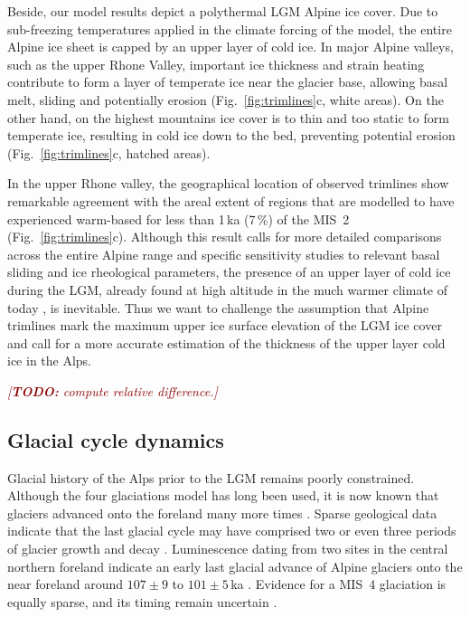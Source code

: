 \documentclass[tc, manuscript]{copernicus}
\newcommand{\todo}[1]{\textcolor{darkred}{\emph{[\textbf{TODO:} #1]}}}
\begin{document}
    Beside, our model results depict a polythermal LGM Alpine ice cover.
    Due to sub-freezing temperatures applied in the climate forcing of the
    model, the entire Alpine ice sheet is capped by an upper layer of cold ice.
    In major Alpine valleys, such as the upper Rhone Valley, important ice
    thickness and strain heating contribute to form a layer of temperate ice
    near the glacier base, allowing basal melt, sliding and potentially
    erosion (Fig.~\ref{fig:trimlines}c, white areas). On the other hand, on the
    highest mountains ice cover is to thin and too static to form temperate
    ice, resulting in cold ice down to the bed, preventing potential erosion
    (Fig.~\ref{fig:trimlines}c, hatched areas).

    In the upper Rhone valley, the geographical location of observed trimlines
    show remarkable agreement with the areal extent of regions that are
    modelled to have experienced warm-based for less than 1\,ka (7\,\%) of the
    MIS~2 (Fig.~\ref{fig:trimlines}c). Although this result calls for more
    detailed comparisons across the
    entire Alpine range and specific sensitivity studies to relevant basal
    sliding and ice rheological parameters, the presence of an upper layer of
    cold ice during the LGM, already found at high altitude in the much warmer
    climate of today \citep{Suter.etal.2001}, is inevitable.
    Thus we want to challenge the assumption that
    Alpine trimlines mark the maximum upper ice surface elevation of the LGM
    ice cover and call for a more accurate estimation of the thickness of the
    upper layer cold ice in the Alps.

    \todo{compute relative difference.}


\subsection{Glacial cycle dynamics}
\label{sec:glaciations}

    Glacial history of the Alps prior to the LGM remains poorly constrained.
    Although the four glaciations model \citep{Penck.Bruckner.1909} has long
    been used, it is now known that glaciers advanced onto the foreland many
    more times \citep{Schluchter.1991, Preusser.etal.2011}. Sparse geological
    data indicate that the last glacial cycle may have comprised two or even
    three periods of glacier growth and decay \citep{Preusser.2004,Ivy-Ochs.etal.2008}.
    Luminescence dating from two sites in the central northern foreland
    indicate an early last glacial advance of Alpine glaciers onto the near
    foreland around $107\pm9$ to $101\pm5$\,ka \citep{Preusser.etal.2003,
    Preusser.Schluchter.2004}. Evidence for a MIS~4 glaciation is equally
    sparse, and its timing remain uncertain \citep[e.g.,][]{Preusser.etal.2003,
    Link.Preusser.2006}.
\end{document}
